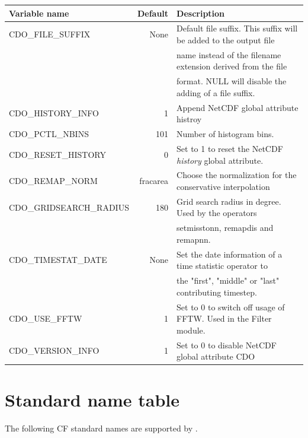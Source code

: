 \begin{tabular}[t]{|>{\columncolor{pcolor1}}l|r|l|}
\hline
\rowcolor{pcolor2}
{\bf Variable name}           &  {\bf Default} & {\bf Description} \\ \hline
CDO\_FILE\_SUFFIX             &   None   &  Default file suffix. This suffix will be added to the output file \\
                                           &               &  name instead of the filename extension derived from the file \\
                                           &               & format. NULL will disable the adding of a file suffix. \\ \hline
CDO\_HISTORY\_INFO        &         1   & Append NetCDF global attribute histroy \\ \hline
CDO\_PCTL\_NBINS            &     101    & Number of histogram bins. \\ \hline
CDO\_RESET\_HISTORY       &         0  & Set to 1 to reset the NetCDF {\it history} global attribute.\\ \hline
CDO\_REMAP\_NORM         &  fracarea & Choose the normalization for the conservative interpolation \\ \hline
CDO\_GRIDSEARCH\_RADIUS       &  180       & Grid search radius in degree. Used by the operators \\
                                                     &        & setmisstonn, remapdis and remapnn. \\ \hline
CDO\_TIMESTAT\_DATE     &  None   & Set the date information of a time statistic operator to \\
                                           &             &  the "first", "middle" or "last" contributing timestep.\\ \hline
CDO\_USE\_FFTW               &         1  & Set to 0 to switch off usage of FFTW. Used in the Filter module.\\ \hline
CDO\_VERSION\_INFO        &         1  & Set to 0 to disable NetCDF global attribute CDO \\ \hline
\end{tabular}





\chapter{\label{stdnametable}Standard name table}

The following CF standard names are supported by {\CDO}.

